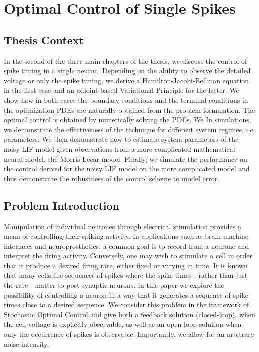 \chapter{Optimal Control of Single Spikes}
\label{ch:spike_control}
\graphicspath{{../OptSpike/}}


 \section{Thesis Context}

In the second of the three main chapters of the thesis, we discuss the control
of spike timing in a single neuron. Depending on the ability to observe the
detailed voltage or only the spike timing, we derive a Hamilton-Jacobi-Bellman
equation in the first case and an adjoint-based Variational Principle for the
latter. We show how in both cases the boundary conditions and the terminal
conditions in the optimization PDEs are naturally obtained from the problem
formulation. The optimal control is obtained by numerically solving the PDEs. We
In simulations, we demonstrate the effectiveness of the technique for
different system regimes, i.e. parameters. We then
demonstrate how to estimate system parameters of the noisy LIF model given
observations from a more complicated mathematical neural model, the Morris-Lecar
model. Finally, we simulate the performance on the control derived for the
noisy LIF model on the more complicated model and thus demonstrate the
robustness of the control scheme to model error. 


\section{Problem Introduction} 
Manipulation of individual neurones through electrical stimulation provides a
mean of controlling their spiking activity. In applications such as
brain-machine interfaces and neuroprosthetics, a common goal is to record from a
neurone and interpret the firing activity. Conversely, one may wish to stimulate
a cell in order that it produce a desired firing rate, either fixed or varying
in time. It is known that many cells fire sequences of spikes where the spike
times - rather than just the rate - matter to post-synaptic neurons. In this
paper we explore the possibility of controlling a neuron in a way that it
generates a sequence of spike times close to a desired sequence. 
We consider this problem in the framework of Stochastic Optimal Control and
give both a feedback solution (closed-loop), when the cell voltage is
explicitly observable, as well as an open-loop solution when only the
occurrence of spikes is observable. Importantly, we allow for an
arbitrary noise intensity.

